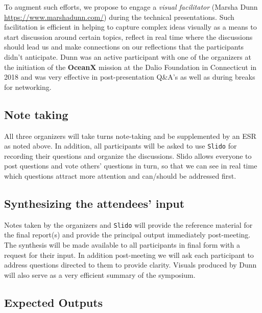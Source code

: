 
To augment such efforts, we propose to engage a \emph{visual
  facilitator} (Marsha Dunn \url{https://www.marshadunn.com/}) during
the technical presentations. Such facilitation is efficient in helping
to capture complex ideas visually as a means to start discussion
around certain topics, reflect in real time where the discussions
should lead us and make connections on our reflections that the
participants didn't anticipate. Dunn was an active participant with
one of the organizers at the initiation of the \textbf{OceanX} mission
at the Dalio Foundation in Connecticut in 2018 and was very effective
in post-presentation Q\&A's as well as during breaks for networking.
 
\subsection{Note taking}

All three organizers will take turns note-taking and be supplemented by
an ESR as noted above. In addition, all participants will be asked to
use \texttt{Slido} for recording their questions and organize the
discussions. Slido allows everyone to post questions and vote others'
questions in turn, so that we can see in real time which questions
attract more attention and can/should be addressed first.
 
 
\subsection{Synthesizing the attendees’ input}

Notes taken by the organizers and \texttt{Slido} will provide the
reference material for the final report(s) and provide the principal
output immediately post-meeting. The synthesis will be made available to
all participants in final form with a request for their input. In
addition post-meeting we will ask each participant to address questions
directed to them to provide clarity. Visuals produced by Dunn will also
serve as a very efficient summary of the symposium.

 
\subsection{Expected Outputs}

